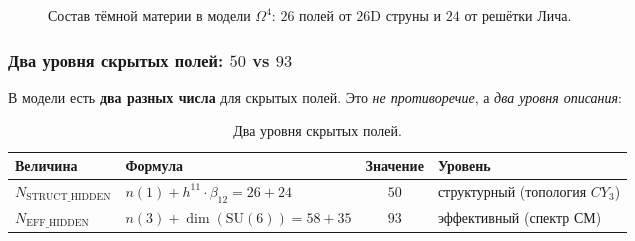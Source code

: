\documentclass[11pt,a4paper]{article}
\newcommand{\SU}{\mathrm{SU}}
\newcommand{\CY}{CY_3}
\newcommand{\Om}{\Omega^4}
\theoremstyle{definition}
\begin{document}
\begin{figure}[htbp]
\centering
{}
\caption{Состав тёмной материи в модели $\Om$: $26$ полей от 
$26$D струны и $24$ от решётки Лича.}
\label{fig:dm-content}
\end{figure}

\subsubsection{Два уровня скрытых полей: \texorpdfstring{$50$ vs $93$}{50 vs 93}}
\label{subsubsec:two-hidden-levels}

В модели есть \textbf{два разных числа} для скрытых полей.
Это \emph{не противоречие}, а \emph{два уровня описания}:

\begin{table}[htbp]
\centering
\caption{Два уровня скрытых полей.}
\label{tab:two-hidden-levels}
\begin{tabular}{llcl}
\toprule
Величина & Формула & Значение & Уровень \\
\midrule
$N_{\text{STRUCT\_HIDDEN}}$ & $n(1) + h^{11} \cdot \beta_{12} = 26 + 24$ & $50$ &
    структурный (топология $\CY$) \\[0.3em]
$N_{\text{EFF\_HIDDEN}}$ & $n(3) + \dim(\SU(6)) = 58 + 35$ & $93$ &
    эффективный (спектр СМ) \\
\bottomrule
\end{tabular}
\end{table}
\end{document}
